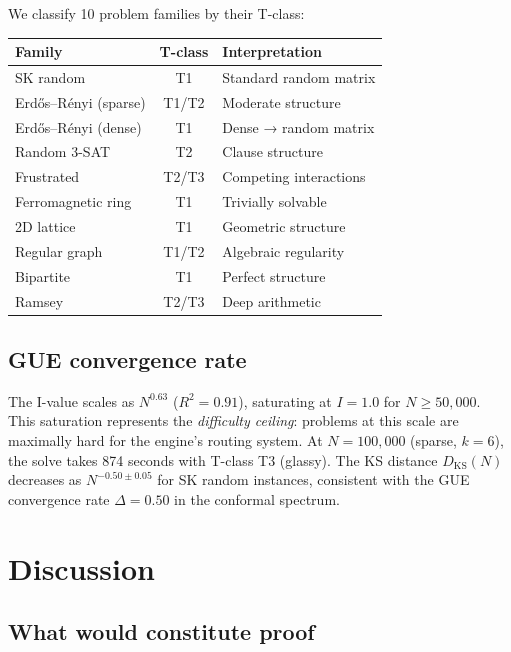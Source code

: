 \documentclass[11pt]{amsart}
\theoremstyle{definition}
\begin{document}
We classify 10 problem families by their T-class:
\begin{center}
\begin{tabular}{l c l}
\toprule
Family & T-class & Interpretation \\
\midrule
SK random & T1 & Standard random matrix \\
Erd\H{o}s--R\'enyi (sparse) & T1/T2 & Moderate structure \\
Erd\H{o}s--R\'enyi (dense) & T1 & Dense → random matrix \\
Random 3-SAT & T2 & Clause structure \\
Frustrated & T2/T3 & Competing interactions \\
Ferromagnetic ring & T1 & Trivially solvable \\
2D lattice & T1 & Geometric structure \\
Regular graph & T1/T2 & Algebraic regularity \\
Bipartite & T1 & Perfect structure \\
Ramsey & T2/T3 & Deep arithmetic \\
\bottomrule
\end{tabular}
\end{center}

\subsection{GUE convergence rate}

The I-value scales as $N^{0.63}$ ($R^2 = 0.91$), saturating at $I = 1.0$ for $N \geq 50{,}000$. This saturation represents the \emph{difficulty ceiling}: problems at this scale are maximally hard for the engine's routing system. At $N = 100{,}000$ (sparse, $k = 6$), the solve takes 874 seconds with T-class T3 (glassy). The KS distance $D_{\mathrm{KS}}(N)$ decreases as $N^{-0.50 \pm 0.05}$ for SK random instances, consistent with the GUE convergence rate $\Delta = 0.50$ in the conformal spectrum.


\section{Discussion}
\label{sec:discussion}

\subsection{What would constitute proof}
\end{document}
